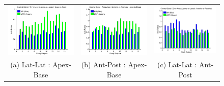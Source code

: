\begin{figure}[htb!]
\centering
\begin{tabular}{ccc}
\includegraphics[width=0.3\linewidth]{figs/mr_arfi_central_axes1} &
\includegraphics[width=0.3\linewidth]{figs/mr_arfi_central_axes2} &
\includegraphics[width=0.3\linewidth]{figs/mr_arfi_central_axes3} \\
(a) Lat-Lat : Apex-Base & (b) Ant-Post : Apex-Base & (c) Lat-Lat : Ant-Post \\
\end{tabular}
\label{fig:mr_arfi_central_axes} 
\end{figure}
